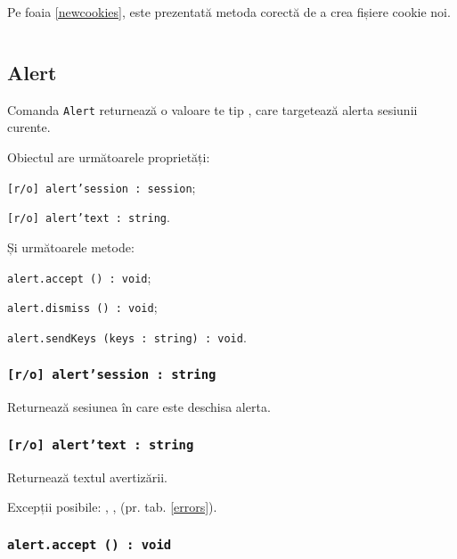 Pe foaia \ref{newcookies}, este prezentată metoda corectă de a crea fișiere cookie noi.

\begin{sourcecode}
    \label{newcookies}
    \inputminted[linenos]{icl}{../sources/newcookies.icL}
\end{sourcecode}


\subsection{{\color{orange} Alert}}

Comanda \texttt{Alert} returnează o valoare te tip  \alert{}, care targetează alerta sesiunii curente.

Obiectul \alert{} are următoarele proprietăți:
\begin{icItems}
	\item \texttt{[r/o] alert'session : session};
	\item \texttt{[r/o] alert'text : string}.
\end{icItems}

Și următoarele metode:
\begin{icItems}
	\item \texttt{alert.accept () : void};
	\item \texttt{alert.dismiss () : void};
	\item \texttt{alert.sendKeys (keys : string) : void}.
\end{icItems}

\subsubsection{\texttt{[r/o] alert'session : string}}

Returnează sesiunea în care este deschisa alerta.

\subsubsection{\texttt{[r/o] alert'text : string}}

Returnează textul avertizării.

Excepții posibile: , ,  (pr. tab. \ref{errors}).

\subsubsection{\texttt{alert.accept () : void}}

